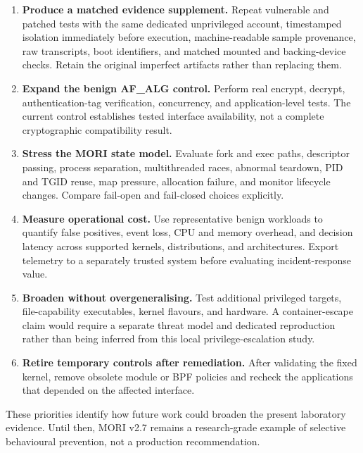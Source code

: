\begin{enumerate}
    \item \textbf{Produce a matched evidence supplement.} Repeat vulnerable and
    patched tests with the same dedicated unprivileged account, timestamped
    isolation immediately before execution, machine-readable sample provenance,
    raw transcripts, boot identifiers, and matched mounted and backing-device
    checks. Retain the original imperfect artifacts rather than replacing them.

    \item \textbf{Expand the benign AF\_ALG control.} Perform real encrypt,
    decrypt, authentication-tag verification, concurrency, and application-level
    tests. The current control establishes tested interface availability, not a
    complete cryptographic compatibility result.

    \item \textbf{Stress the MORI state model.} Evaluate fork and exec paths,
    descriptor passing, process separation, multithreaded races, abnormal
    teardown, PID and TGID reuse, map pressure, allocation failure, and monitor
    lifecycle changes. Compare fail-open and fail-closed choices explicitly.

    \item \textbf{Measure operational cost.} Use representative benign
    workloads to quantify false positives, event loss, CPU and memory overhead,
    and decision latency across supported kernels, distributions, and
    architectures. Export telemetry to a separately trusted system before
    evaluating incident-response value.

    \item \textbf{Broaden without overgeneralising.} Test additional privileged
    targets, file-capability executables, kernel flavours, and hardware. A
    container-escape claim would require a separate threat model and dedicated
    reproduction rather than being inferred from this local privilege-escalation
    study.

    \item \textbf{Retire temporary controls after remediation.} After
    validating the fixed kernel, remove obsolete module or BPF policies and
    recheck the applications that depended on the affected interface.
\end{enumerate}

These priorities identify how future work could broaden the present laboratory
evidence. Until then, MORI v2.7 remains a research-grade example of selective
behavioural prevention, not a production recommendation.

